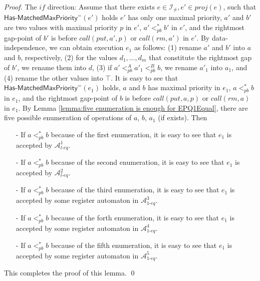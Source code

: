 \begin {proof}
\noindent The $\textit{if}$ direction: Assume that there exists $e \in \mathcal{I}_{\neq},e' \in \textit{proj}(e)$, such that $\mathsf{Has\text{-}MatchedMaxPriority}^{=}(e')$ holds $e'$ has only one maximal priority, $a'$ and $b'$ are two values with maximal priority $p$ in $e'$, $a' <_{\textit{pb}}^* b'$ in $e'$, and the rightmost gap-point of $b'$ is before $\textit{call}(\textit{put},a',p)$ or $\textit{call}(\textit{rm},a')$ in $e'$. By data-independence, we can obtain execution $e_1$ as follows: (1) rename $a'$ and $b'$ into $a$ and $b$, respectively, (2) for the values $d_1,\ldots,d_m$ that constitute the rightmost gap of $b'$, we rename them into $d$, (3) if $a' <_{\textit{pb}}^A a'_1 <_{\textit{pb}}^B b$, we rename $a'_1$ into $a_1$, and (4) rename the other values into $\top$. It is easy to see that $\mathsf{Has\text{-}MatchedMaxPriority}^{=}(e_1)$ holds, $a$ and $b$ has maximal priority in $e_1$, $a <_{\textit{pb}}^* b$ in $e_1$, and the rightmost gap-point of $b$ is before $\textit{call}(\textit{put},a,p)$ or $\textit{call}(\textit{rm},a)$ in $e_1$. By Lemma \ref{lemma:five enumeration is enough for EPQ1Equal}, there are five possible enumeration of operations of $a$, $b$, $a_1$ (if exists). Then


\begin{itemize}
\setlength{\itemsep}{0.5pt}
\item[-] If $a <_{\textit{pb}}^* b$ because of the first enumeration, it is easy to see that $e_1$ is accepted by $\mathcal{A}_{\textit{l-eq}}^1$.

\item[-] If $a <_{\textit{pb}}^* b$ because of the second enumeration, it is easy to see that $e_1$ is accepted by $\mathcal{A}_{\textit{l-eq}}^2$.

\item[-] If $a <_{\textit{pb}}^* b$ because of the third enumeration, it is easy to see that $e_1$ is accepted by some register automaton in $\mathcal{A}_{\textit{1-eq}}^{3}$.

\item[-] If $a <_{\textit{pb}}^* b$ because of the forth enumeration, it is easy to see that $e_1$ is accepted by some register automaton in $\mathcal{A}_{\textit{1-eq}}^{4}$.

\item[-] If $a <_{\textit{pb}}^* b$ because of the fifth enumeration, it is easy to see that $e_1$ is accepted by some register automaton in $\mathcal{A}_{\textit{1-eq}}^{5}$.
\end{itemize}

This completes the proof of this lemma. \qed
\end {proof}





